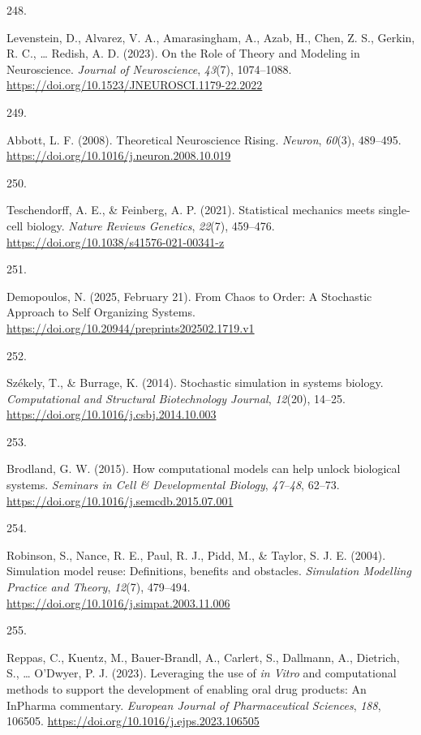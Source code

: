 \documentclass[
  11pt,
  letterpaper,
]{scrreprt}
\newlength{\cslhangindent}
\newlength{\csllabelwidth}
\newenvironment{CSLReferences}[2] %
 {\begin{list}{}{%
  \setlength{\itemindent}{0pt}
  \setlength{\leftmargin}{0pt}
  \setlength{\parsep}{0pt}
  \ifodd #1
   \setlength{\leftmargin}{\cslhangindent}
   \setlength{\itemindent}{-1\cslhangindent}
  \fi
  \setlength{\itemsep}{#2\baselineskip}}}
 {\end{list}}
\newcommand{\CSLLeftMargin}[1]{\parbox[t]{\csllabelwidth}{\strut#1\strut}}
\newcommand{\CSLRightInline}[1]{\parbox[t]{\linewidth - \csllabelwidth}{\strut#1\strut}}
\begin{document}
\begin{CSLReferences}{0}{0}
\CSLLeftMargin{248. }%
\CSLRightInline{Levenstein, D., Alvarez, V. A., Amarasingham, A., Azab,
H., Chen, Z. S., Gerkin, R. C., \ldots{} Redish, A. D. (2023). On the
{Role} of {Theory} and {Modeling} in {Neuroscience}. \emph{Journal of
Neuroscience}, \emph{43}(7), 1074--1088.
\url{https://doi.org/10.1523/JNEUROSCI.1179-22.2022}}

\CSLLeftMargin{249. }%
\CSLRightInline{Abbott, L. F. (2008). Theoretical {Neuroscience Rising}.
\emph{Neuron}, \emph{60}(3), 489--495.
\url{https://doi.org/10.1016/j.neuron.2008.10.019}}

\CSLLeftMargin{250. }%
\CSLRightInline{Teschendorff, A. E., \& Feinberg, A. P. (2021).
Statistical mechanics meets single-cell biology. \emph{Nature Reviews
Genetics}, \emph{22}(7), 459--476.
\url{https://doi.org/10.1038/s41576-021-00341-z}}

\CSLLeftMargin{251. }%
\CSLRightInline{Demopoulos, N. (2025, February 21). From {Chaos} to
{Order}: {A Stochastic Approach} to {Self Organizing Systems}.
\url{https://doi.org/10.20944/preprints202502.1719.v1}}

\CSLLeftMargin{252. }%
\CSLRightInline{Székely, T., \& Burrage, K. (2014). Stochastic
simulation in systems biology. \emph{Computational and Structural
Biotechnology Journal}, \emph{12}(20), 14--25.
\url{https://doi.org/10.1016/j.csbj.2014.10.003}}

\CSLLeftMargin{253. }%
\CSLRightInline{Brodland, G. W. (2015). How computational models can
help unlock biological systems. \emph{Seminars in Cell \& Developmental
Biology}, \emph{47--48}, 62--73.
\url{https://doi.org/10.1016/j.semcdb.2015.07.001}}

\CSLLeftMargin{254. }%
\CSLRightInline{Robinson, S., Nance, R. E., Paul, R. J., Pidd, M., \&
Taylor, S. J. E. (2004). Simulation model reuse: Definitions, benefits
and obstacles. \emph{Simulation Modelling Practice and Theory},
\emph{12}(7), 479--494.
\url{https://doi.org/10.1016/j.simpat.2003.11.006}}

\CSLLeftMargin{255. }%
\CSLRightInline{Reppas, C., Kuentz, M., Bauer-Brandl, A., Carlert, S.,
Dallmann, A., Dietrich, S., \ldots{} O'Dwyer, P. J. (2023). Leveraging
the use of {\emph{in Vitro}} and computational methods to support the
development of enabling oral drug products: {An InPharma} commentary.
\emph{European Journal of Pharmaceutical Sciences}, \emph{188}, 106505.
\url{https://doi.org/10.1016/j.ejps.2023.106505}}


\end{CSLReferences}
\end{document}
